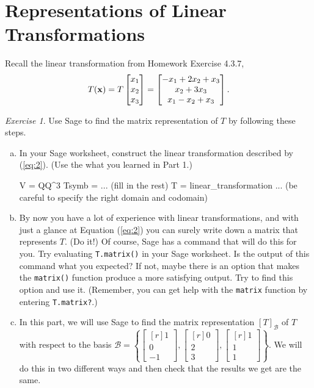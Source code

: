 \documentclass[fleqn,11pt]{paper}
\theoremstyle{remark}
\newtheorem{exercise}{Exercise}
\renewcommand{\vec}[1]{\mathbf{#1}}
\newcommand{\<}{\ensuremath{\langle}}
\renewcommand{\>}{\ensuremath{\rangle}}
\newcommand\sB{\ensuremath{\mathcal B}}
\newcommand\vx{\vec{x}}
\begin{document}
\section{Representations of Linear Transformations}
Recall the linear transformation from Homework Exercise 4.3.7,
\begin{equation}
\label{eq:2}
T(\vx) = T\colvector{x_1\\x_2\\x_3} =\colvector{-x_1 + 2x_2 + x_3\\x_2 + 3x_3\\x_1 - x_2 + x_3}.
\end{equation}
%
\begin{exercise} Use Sage to find the matrix representation of $T$ by following these steps.
  \begin{enumerate}[(a)]
  \item In your Sage worksheet, construct the linear transformation described by (\ref{eq:2}). 
    (Use the what you learned in Part 1.)
%
\begin{sageblock}
V = QQ^3
Tsymb = ...          (fill in the rest)
T = linear_transformation ...   
                     (be careful to specify the right domain and codomain)
\end{sageblock}
%
\item  By now you have a lot of experience with linear transformations, and with just a 
  glance at Equation (\ref{eq:2}) you can surely write down a matrix that represents 
  $T$.  (Do it!)  Of course, Sage has a command that will do this for you.  Try 
  evaluating \verb!T.matrix()! in your Sage worksheet. Is the output of this command what you expected?
  If not, maybe there is an option that makes the 
  \verb!matrix()! function produce a more satisfying output.  Try to find this option and use it.
   (Remember, you can get help with the \verb!matrix! function by entering \verb!T.matrix?!.)

\item In this part, we will use Sage to find the matrix representation $[T]_\sB$ of $T$ with respect to the basis
  $\sB = \left\{
  \begin{bmatrix*}[r]1\\0\\-1 \end{bmatrix*},
  \begin{bmatrix*}[r]0\\2\\3 \end{bmatrix*},
  \begin{bmatrix*}[r]1\\1\\1 \end{bmatrix*}\right\}$. We will do this in two different ways 
  and then check that the results we get are the same.
  

\end{enumerate}
\end{exercise}
\end{document}
